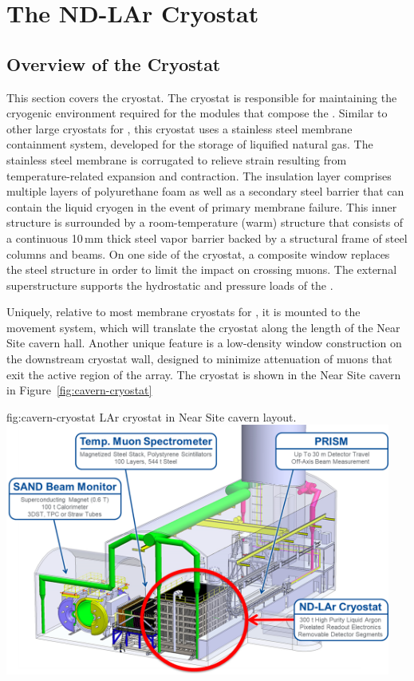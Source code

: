 \chapter{The ND-LAr Cryostat}
\label{ch:cryostat}


\section{Overview of the Cryostat}
\label{sec:cryost-ovvw}
This section covers the  cryostat. The cryostat is responsible for maintaining the  cryogenic environment required for the  modules that compose the .  Similar to other large cryostats for , this cryostat uses a stainless steel membrane containment system, developed for the storage of liquified natural gas. The stainless steel membrane is corrugated to relieve strain resulting from temperature-related expansion and contraction. The insulation layer comprises multiple layers of polyurethane foam as well as a secondary steel barrier that can contain the liquid cryogen in the event of primary membrane failure. This inner structure is surrounded by a room-temperature (warm) structure that consists of a continuous 10\,mm thick steel vapor barrier backed by a structural frame of steel columns and beams. On one side of the cryostat, a composite window replaces the steel structure in order to limit the impact on crossing muons. The external superstructure supports the hydrostatic and pressure loads of the . 

Uniquely, relative to most membrane cryostats for , it is mounted to the  movement system, which will translate the cryostat along the length of the Near Site cavern hall.  Another unique feature is a low-density window construction on the downstream cryostat wall, designed to minimize attenuation of muons that exit the active region of the  array. The  cryostat is shown in the Near Site cavern in Figure~\ref{fig:cavern-cryostat}

\begin{dunefigure}{fig:cavern-cryostat}
{LAr cryostat in Near Site cavern layout.}
\includegraphics[width=0.95\textwidth]{graphics/cryostat/cavern-cryostat.png}
\end{dunefigure}

